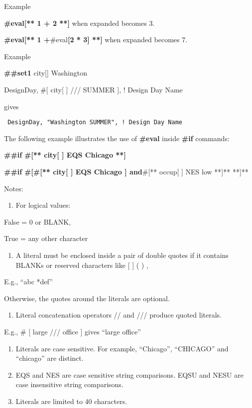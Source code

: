 Example

\textbf{\#eval{[}** 1 + 2 **{]}} when expanded becomes 3.

\textbf{\#eval{[}** 1 +}\#eval\textbf{{[}2 * 3{]} **{]}} when expanded becomes 7.

Example

\textbf{\#\#set1} city{[}{]} Washington

DesignDay, \#{[} city{[} {]} /// SUMMER {]}, ! Design Day Name

gives

\begin{lstlisting}
 DesignDay, "Washington SUMMER", ! Design Day Name
\end{lstlisting}

The following example illustrates the use of \textbf{\#eval} inside \textbf{\#if} commands:

\textbf{\#\#if} \textbf{\#{[}** city{[} {]} EQS Chicago **{]}}

\textbf{\#\#if} \textbf{\#{[}\#{[}** city{[} {]} EQS Chicago {]} and}\#{[}** occup{[} {]} NES low **{]}** **{]}**

Notes:

\begin{enumerate}
\def\labelenumi{\arabic{enumi}.}
\tightlist
\item
  For logical values:
\end{enumerate}

False = 0 or BLANK,

True = any other character

\begin{enumerate}
\def\labelenumi{\arabic{enumi}.}
\setcounter{enumi}{1}
\tightlist
\item
  A literal must be enclosed inside a pair of double quotes if it contains BLANKs or reserved characters like {[} {]} ( ) ,
\end{enumerate}

E.g., ``abc *def''

Otherwise, the quotes around the literals are optional.

\begin{enumerate}
\def\labelenumi{\arabic{enumi}.}
\setcounter{enumi}{2}
\tightlist
\item
  Literal concatenation operators // and /// produce quoted literals.
\end{enumerate}

E.g., \# {[} large /// office {]} gives ``large office''

\begin{enumerate}
\def\labelenumi{\arabic{enumi}.}
\setcounter{enumi}{3}
\item
  Literals are case sensitive. For example, ``Chicago'', ``CHICAGO'' and ``chicago'' are distinct.
\item
  EQS and NES are case sensitive string comparisons. EQSU and NESU are case insensitive string comparisons.
\item
  Literals are limited to 40 characters.
\end{enumerate}
